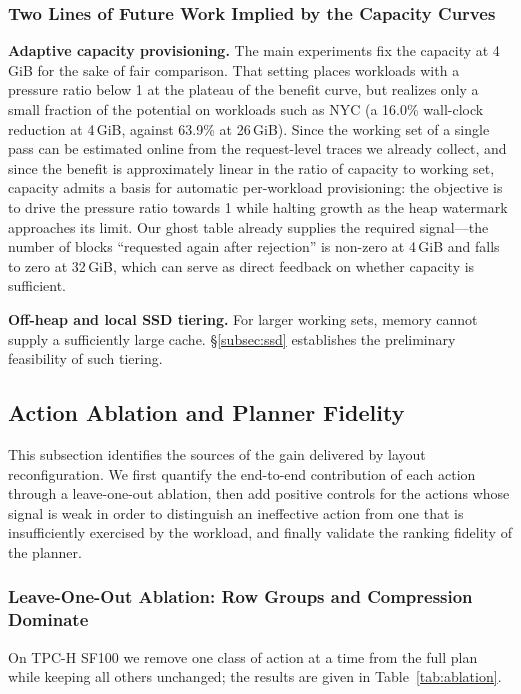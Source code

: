 \subsubsection{Two Lines of Future Work Implied by the Capacity Curves}

\textbf{Adaptive capacity provisioning.}
The main experiments fix the capacity at 4\,GiB for the sake of fair comparison.
That setting places workloads with a pressure ratio below 1 at the plateau of
the benefit curve, but realizes only a small fraction of the potential on
workloads such as NYC (a 16.0\% wall-clock reduction at 4\,GiB, against 63.9\% at
26\,GiB). Since the working set of a single pass can be estimated online from the
request-level traces we already collect, and since the benefit is approximately
linear in the ratio of capacity to working set, capacity admits a basis for
automatic per-workload provisioning: the objective is to drive the pressure ratio
towards 1 while halting growth as the heap watermark approaches its limit. Our
ghost table already supplies the required signal---the number of blocks
``requested again after rejection'' is non-zero at 4\,GiB and falls to zero at
32\,GiB, which can serve as direct feedback on whether capacity is sufficient.

\textbf{Off-heap and local SSD tiering.}
For larger working sets, memory cannot supply a sufficiently large cache.
\S\ref{subsec:ssd} establishes the preliminary feasibility of such tiering.
\subsection{Action Ablation and Planner Fidelity}
\label{subsec:ablation}

This subsection identifies the sources of the gain delivered by layout
reconfiguration. We first quantify the end-to-end contribution of each action
through a leave-one-out ablation, then add positive controls for the actions
whose signal is weak in order to distinguish an ineffective action from one that
is insufficiently exercised by the workload, and finally validate the ranking
fidelity of the planner.

\subsubsection{Leave-One-Out Ablation: Row Groups and Compression Dominate}

On TPC-H SF100 we remove one class of action at a time from the full plan while
keeping all others unchanged; the results are given in
Table~\ref{tab:ablation}.

